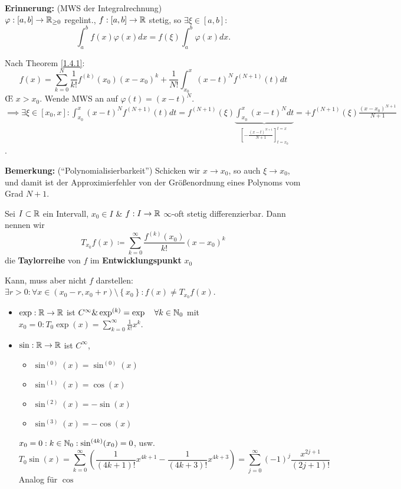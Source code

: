 \textbf{Erinnerung:} (MWS der Integralrechnung)\\
$ \varphi : [a, b] \to \mathbb{R} _{\geq 0}  $ regelint., $ f: [a, b] \to \mathbb{R}  $ stetig, so $ \exists \xi \in [a, b] : $ 
\[
	\int_{a}^{b}f(x) \varphi(x) dx = f(\xi)\int_{a}^{b}\varphi(x) dx.
\]

\begin{subproof*}
	Nach Theorem \ref{1.4.1}:
	\[
		f(x) = \sum_{k=0}^{N} \frac{ 1 }{ k! } f^{(k)} (x_0) (x - x_0)^k + \frac{ 1 }{ N! } \int_{x_0}^{x} (x - t)^{N} f^{(N+1)} (t) dt
	\]
	\OE{} $ x > x_0 $. Wende MWS an auf $ \varphi(t) = (x - t)^{N}  $.\\
$ \implies \exists \xi \in [x_0, x]: \int_{x_0}^{x} (x - t)^{N} f^{(N+1)} (t) dt = f^{(N+1)}(\xi) \underbrace{\int_{x_0}^{x}(x-t)^{N} dt}_{\left[ - \frac{ (x - t)^{N+1} }{ N+1 }  \right]_{t = x_0} ^{t = x} } = + f^{(N+1)} (\xi) \frac{ (x - x_0)^{N+1} }{ N + 1 } $.
\end{subproof*}

\textbf{Bemerkung:} (``Polynomialisierbarkeit'') Schicken wir $ x \to x_0 $, so auch $ \xi \to x_0 $, und damit ist der Approximierfehler von der Größenordnung eines Polynoms vom Grad $ N + 1 $.

\begin{subdefinition}
	Sei $ I \subset  \mathbb{R}  $ ein Intervall, $ x_0 \in I $ \& $ f: I \to \mathbb{R}  $ $ \infty $-oft stetig differenzierbar. Dann nennen wir
	\[
		T_{x_0}  f(x) \coloneqq \sum_{k=0}^{\infty} \frac{ f^{(k)} (x_0) }{ k! }  (x - x_0)^k 
	\]
	die \textbf{Taylorreihe} von $ f $ im \textbf{Entwicklungspunkt} $ x_0 $ 

	Kann, muss aber nicht $ f $ darstellen: $ \exists r > 0 : \forall x \in ( x_0 - r, x_0 + r) \setminus \left\{ x_0 \right\} : f(x) \neq T_{x_0} f(x) $.
\end{subdefinition}

\begin{subexample}
	\begin{itemize}
		\item $ \exp : \mathbb{R} \to \mathbb{R}  $ ist $ C^{\infty} \& \exp ^{(k)} = \exp \quad \forall k \in \mathbb{N} _0 $ mit $ x_0 = 0 : T_0 \exp (x) = \sum_{k=0}^{\infty} \frac{ 1 }{ k! } x^k $.
		\item $ \sin : \mathbb{R} \to \mathbb{R}  $ ist $ C^{\infty} $,
			\begin{itemize}
				\item $ \sin ^{(0)} (x) = \sin ^{(0)} (x) $
				\item $ \sin ^{(1)} (x) = \cos (x) $
				\item $ \sin ^{(2)} (x) = - \sin (x) $
				\item $ \sin ^{(3)} (x) = - \cos (x) $
			\end{itemize}
			$ x_0 = 0 : k \in \mathbb{N} _0 : \sin ^{(4k)} (x_0) = 0 $, usw.
			\[
				T_0 \sin (x) = \sum_{k=0}^{\infty} \left( \frac{ 1 }{ (4k + 1)! } x^{4k + 1} - \frac{ 1 }{ (4k + 3)! } x^{4k + 3}  \right) 
				= \sum_{j=0}^{\infty} (-1)^j \frac{ x^{2j + 1} }{ (2j + 1)! } 
			\]
			Analog für $ \cos  $
	\end{itemize}
\end{subexample}

